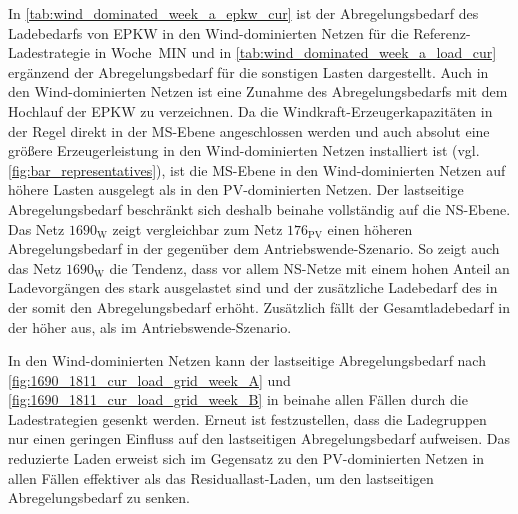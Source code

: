 In \autoref{tab:wind_dominated_week_a_epkw_cur} ist der Abregelungsbedarf des Ladebedarfs von \gls{EPKW} in den Wind-dominierten Netzen für die Referenz-Ladestrategie in Woche~MIN und in \autoref{tab:wind_dominated_week_a_load_cur} ergänzend der Abregelungsbedarf für die sonstigen Lasten dargestellt.
Auch in den Wind-dominierten Netzen ist eine Zunahme des Abregelungsbedarfs mit dem Hochlauf der \gls{EPKW} zu verzeichnen.
Da die Windkraft-Erzeugerkapazitäten in der Regel direkt in der \gls{MS}-Ebene angeschlossen werden und auch absolut eine größere Erzeugerleistung in den Wind-dominierten Netzen installiert ist (vgl. \autoref{fig:bar_representatives}), ist die \gls{MS}-Ebene in den Wind-dominierten Netzen auf höhere Lasten ausgelegt als in den \gls{PV}-dominierten Netzen.
Der lastseitige Abregelungsbedarf beschränkt sich deshalb beinahe vollständig auf die \gls{NS}-Ebene.
Das Netz \(1690_{\text{W}}\) zeigt vergleichbar zum Netz \(176_{\text{PV}}\) einen höheren Abregelungsbedarf in der \SzeFirmenparkplatz gegenüber dem Antriebswende-Szenario.
So zeigt auch das Netz \(1690_{\text{W}}\) die Tendenz, dass vor allem \gls{NS}-Netze mit einem hohen Anteil an Ladevorgängen des \UC \zH stark ausgelastet sind und der zusätzliche Ladebedarf des \UC \zH in der \SzeFirmenparkplatz somit den Abregelungsbedarf erhöht.
Zusätzlich fällt der Gesamtladebedarf in der \SzeFirmenparkplatz höher aus, als im Antriebswende-Szenario.





In den Wind-dominierten Netzen kann der lastseitige Abregelungsbedarf nach \autoref{fig:1690_1811_cur_load_grid_week_A} und \autoref{fig:1690_1811_cur_load_grid_week_B} in beinahe allen Fällen durch die Ladestrategien gesenkt werden.
Erneut ist festzustellen, dass die Ladegruppen nur einen geringen Einfluss auf den lastseitigen Abregelungsbedarf aufweisen.
Das reduzierte Laden erweist sich im Gegensatz zu den \gls{PV}-dominierten Netzen in allen Fällen effektiver als das Residuallast-Laden, um den lastseitigen Abregelungsbedarf zu senken.\medskip



